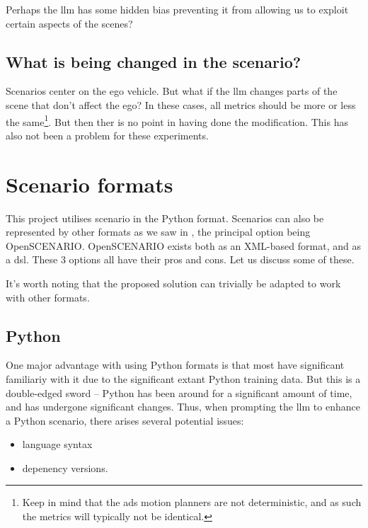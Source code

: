 Perhaps the \acrshort{llm} has some hidden bias preventing it from allowing us to exploit certain
aspects of the scenes?

\subsection{What is being changed in the scenario?}

Scenarios center on the ego vehicle. But what if the \acrshort{llm} changes parts of the scene that
don't affect the ego? In these cases, all metrics should be more or less the same\footnote{Keep in
    mind that the \acrshort{ads} motion planners are not deterministic, and as such the metrics will typically
    not be identical.}. But then ther is no point in having done the modification. This has also not
been a problem for these experiments.

\section{Scenario formats}

This project utilises scenario in the Python format. Scenarios can also be represented by other
formats as we saw in , the principal option being OpenSCENARIO.
OpenSCENARIO exists both as an XML-based format, and as a \acrfull{dsl}. These \num{3} options all
have their pros and cons. Let us discuss some of these.

It's worth noting that the proposed solution can trivially be adapted to work with other formats.

\subsection{Python}

One major advantage with using Python formats is that most  have significant
familiariy with it due to the significant extant Python training data. But this is a double-edged
sword -- Python has been around for a significant amount of time, and has undergone significant
changes. Thus, when prompting the \acrshort{llm} to enhance a Python scenario, there arises several
potential issues: \begin{itemize}
    \item language syntax
    \item depenency versions.
\end{itemize}

